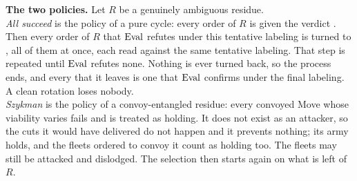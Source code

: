 \documentclass[12pt,a4paper]{article}
\begin{document}
\textbf{The two policies.}
Let $R$ be a genuinely ambiguous residue.\\
\emph{All succeed} is the policy of a pure cycle: every order of $R$ is given the verdict .
Then every order of $R$ that $\operatorname{Eval}$ refutes under this tentative labeling is turned to , all of them at once, each read against the same tentative labeling.
That step is repeated until $\operatorname{Eval}$ refutes none.
Nothing is ever turned back, so the process ends, and every  that it leaves is one that $\operatorname{Eval}$ confirms under the final labeling.
A clean rotation loses nobody.\\
\emph{Szykman} is the policy of a convoy-entangled residue: every convoyed Move whose viability varies fails and is treated as holding.
It does not exist as an attacker, so the cuts it would have delivered do not happen and it prevents nothing; its army holds, and the fleets ordered to convoy it count as holding too.
The fleets may still be attacked and dislodged.
The selection then starts again on what is left of $R$.
\end{document}
